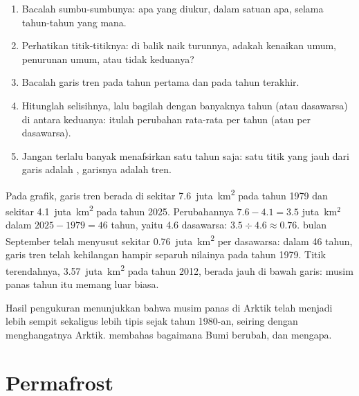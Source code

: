 \begin{method}
\begin{enumerate}
  \item Bacalah sumbu-sumbunya: apa yang diukur, dalam satuan apa, selama
        tahun-tahun yang mana.
  \item Perhatikan titik-titiknya: di balik naik turunnya, adakah kenaikan
        umum, penurunan umum, atau tidak keduanya?
  \item Bacalah garis tren pada tahun pertama dan pada tahun terakhir.
  \item Hitunglah selisihnya, lalu bagilah dengan banyaknya tahun (atau
        dasawarsa) di antara keduanya: itulah perubahan rata-rata per tahun
        (atau per dasawarsa).
  \item Jangan terlalu banyak menafsirkan satu tahun saja: satu titik yang
        jauh dari garis adalah , garisnya adalah tren.
\end{enumerate}
\end{method}

\begin{example}
Pada grafik, garis tren berada di sekitar \num{7.6}~juta~\unit{km^2} pada
tahun 1979 dan sekitar \num{4.1}~juta~\unit{km^2} pada tahun 2025.
Perubahannya $7.6 - 4.1 =
3.5$ juta~km$^2$ dalam $2025 - 1979 = 46$ tahun, yaitu 4.6 dasawarsa:
$3.5 \div 4.6 \approx 0.76$.  bulan September telah menyusut sekitar
\num{0.76}~juta~\unit{km^2} per dasawarsa: dalam 46 tahun, garis tren
telah kehilangan hampir separuh nilainya pada tahun 1979. Titik
terendahnya, \num{3.57}~juta~\unit{km^2} pada tahun 2012, berada jauh di
bawah garis: musim panas tahun itu memang luar biasa.
\end{example}

Hasil pengukuran menunjukkan bahwa  musim panas di Arktik telah
menjadi lebih sempit sekaligus lebih tipis sejak tahun 1980-an, seiring
dengan menghangatnya Arktik. 
membahas bagaimana  Bumi berubah, dan mengapa.

\section{Permafrost}


